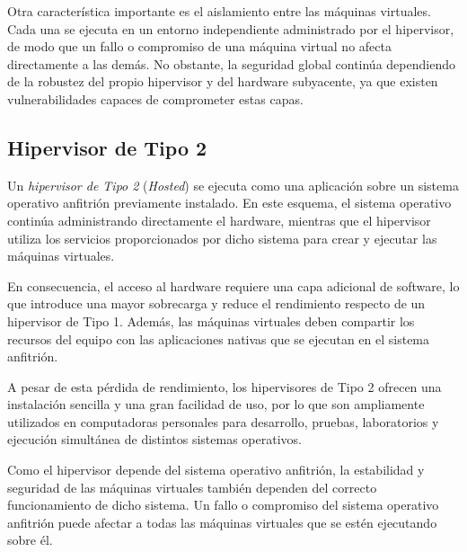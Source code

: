 Otra característica importante es el aislamiento entre las máquinas virtuales. Cada una se ejecuta en un entorno independiente administrado por el hipervisor, de modo que un fallo o compromiso de una máquina virtual no afecta directamente a las demás. No obstante, la seguridad global continúa dependiendo de la robustez del propio hipervisor y del hardware subyacente, ya que existen vulnerabilidades capaces de comprometer estas capas.

\subsection{Hipervisor de Tipo 2}

Un \textit{hipervisor de Tipo 2} (\textit{Hosted}) se ejecuta como una aplicación sobre un sistema operativo anfitrión previamente instalado. En este esquema, el sistema operativo continúa administrando directamente el hardware, mientras que el hipervisor utiliza los servicios proporcionados por dicho sistema para crear y ejecutar las máquinas virtuales.

En consecuencia, el acceso al hardware requiere una capa adicional de software, lo que introduce una mayor sobrecarga y reduce el rendimiento respecto de un hipervisor de Tipo 1. Además, las máquinas virtuales deben compartir los recursos del equipo con las aplicaciones nativas que se ejecutan en el sistema anfitrión.

A pesar de esta pérdida de rendimiento, los hipervisores de Tipo 2 ofrecen una instalación sencilla y una gran facilidad de uso, por lo que son ampliamente utilizados en computadoras personales para desarrollo, pruebas, laboratorios y ejecución simultánea de distintos sistemas operativos.

Como el hipervisor depende del sistema operativo anfitrión, la estabilidad y seguridad de las máquinas virtuales también dependen del correcto funcionamiento de dicho sistema. Un fallo o compromiso del sistema operativo anfitrión puede afectar a todas las máquinas virtuales que se estén ejecutando sobre él.

